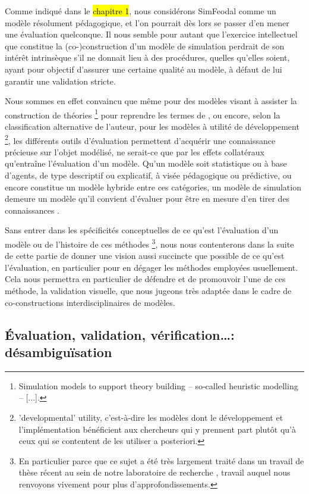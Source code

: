 Comme indiqué dans le \hl{chapitre 1}, nous considérons SimFeodal comme un modèle résolument pédagogique, et l'on pourrait dès lors se passer d'en mener une évaluation quelconque.
Il nous semble pour autant que l'exercice intellectuel que constitue la (co-)construction d'un modèle de simulation perdrait de son intérêt intrinsèque s'il ne donnait lieu à des procédures, quelles qu'elles soient, ayant pour objectif d'assurer une certaine qualité au modèle, à défaut de lui garantir une validation stricte.

Nous sommes en effet convaincu que même pour des modèles visant à \og assister la construction de théories\fg{}
\footnote{
	\og [...] Simulation models to support theory building -- so-called heuristic modelling -- [...].\fg{}
} pour reprendre les termes de \cite[260]{lake_trends_2014}, ou encore, selon la classification alternative de l'auteur, pour les modèles à utilité \og de développement\fg{}
\footnote{
	\og 'developmental' utility\fg{}, c'est-à-dire les modèles dont le développement et l'implémentation bénéficient aux chercheurs qui y prennent part plutôt qu'à ceux qui se contentent de les utiliser a posteriori.
}, les différents outils d'évaluation permettent d'acquérir une connaissance précieuse sur l'objet modélisé, ne serait-ce que par les effets collatéraux qu'entraîne l'évaluation d'un modèle.
Qu'un modèle soit statistique ou à base d'agents, de type descriptif ou explicatif, à visée pédagogique ou prédictive, ou encore constitue un modèle \og hybride\fg{} entre ces catégories, un modèle de simulation demeure un modèle qu'il convient d'évaluer pour être en mesure d'en tirer des connaissances \autocite[299-300]{sargent_history_2017}.

Sans entrer dans les spécificités conceptuelles de ce qu'est l'évaluation d'un modèle ou de l'histoire de ces méthodes
\footnote{
	En particulier parce que ce sujet a été très largement traité dans un travail de thèse récent au sein de notre laboratoire de recherche \autocite[pp. 58--184]{rey-coyrehourcq_plateforme_2015}, travail auquel nous renvoyons vivement pour plus d'approfondissements.
}, nous nous contenterons dans la suite de cette partie de donner une vision aussi succincte que possible de ce qu'est l'évaluation, en particulier pour en dégager les méthodes employées usuellement.
Cela nous permettra en particulier de défendre et de promouvoir l'une de ces méthode, la validation visuelle, que nous jugeons très adaptée dans le cadre de co-constructions interdisciplinaires de modèles.

\subsection{Évaluation, validation, vérification\ldots : désambiguïsation}

